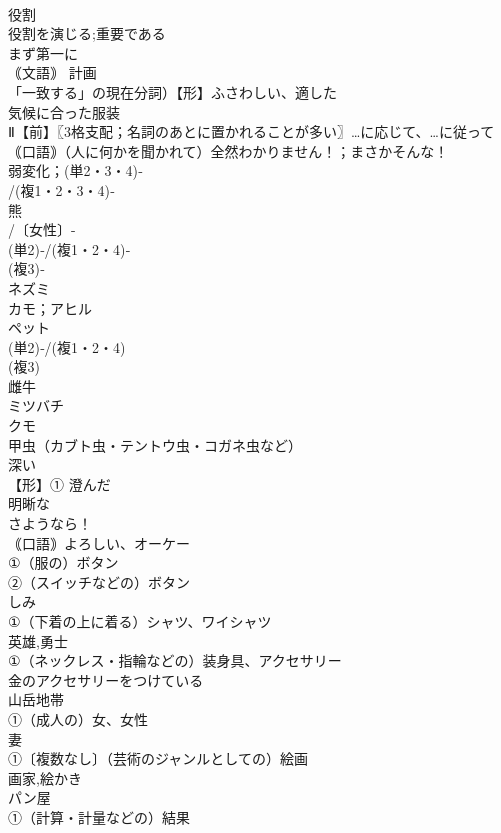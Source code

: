 \documentclass[8pt]{extreport}
\begin{document}
\begin{CJK}{UTF8}{min}
\\	役割 
\\	役割を演じる;重要である
\\	まず第一に
\\	｟文語｠ 計画 
\\	「一致する」の現在分詞）【形】ふさわしい、適した 
\\	気候に合った服装 
\\	Ⅱ【前】〖3格支配；名詞のあとに置かれることが多い〗…に応じて、…に従って
\\	｟口語｠（人に何かを聞かれて）全然わかりません！；まさかそんな！
\\	弱変化；(単2・3・4)‐
\\	/(複1・2・3・4)‐
\\	熊 
\\	/〔女性〕-
\\	(単2)‐/(複1・2・4)‐
\\	(複3)‐
\\	ネズミ
\\	カモ；アヒル
\\	ペット 
\\	(単2)‐/(複1・2・4)
\\	(複3)
\\	雌牛
\\	ミツバチ
\\	クモ 
\\	甲虫（カブト虫・テントウ虫・コガネ虫など）
\\	深い
\\	【形】① 澄んだ 
\\	明晰な
\\	さようなら！
\\	｟口語｠よろしい、オーケー
\\	①（服の）ボタン
\\	②（スイッチなどの）ボタン
\\	しみ
\\	①（下着の上に着る）シャツ、ワイシャツ
\\	英雄,勇士
\\	①（ネックレス・指輪などの）装身具、アクセサリー
\\	金のアクセサリーをつけている
\\	山岳地帯　
\\	①（成人の）女、女性
\\	妻
\\	①〔複数なし〕（芸術のジャンルとしての）絵画
\\	画家,絵かき
\\	パン屋
\\	①（計算・計量などの）結果

\end{CJK}
\end{document}
